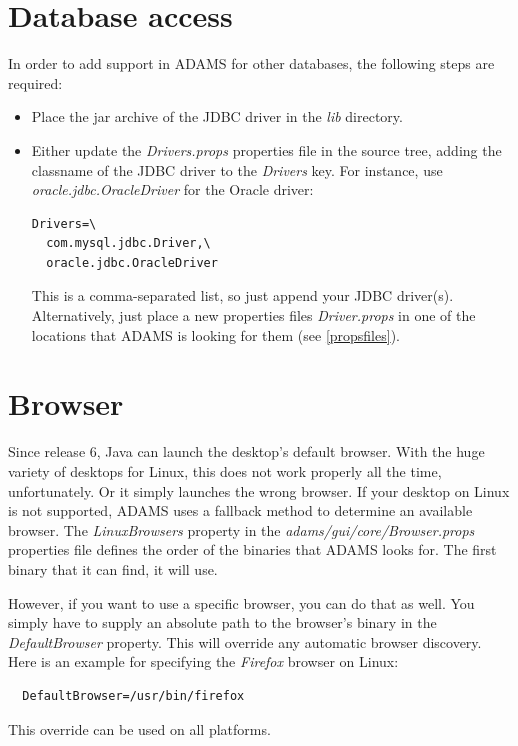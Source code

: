 \section{Database access}
\label{databaseaccess}
In order to add support in ADAMS for other databases, the following steps
are required:
\begin{itemize}
	\item Place the jar archive of the JDBC driver in the \textit{lib} directory.
	\item Either update the \textit{Drivers.props} properties file in the source
	tree, adding the classname of the JDBC driver to the \textit{Drivers} key. For instance,
	use \textit{oracle.jdbc.OracleDriver} for the Oracle driver: \\
\begin{verbatim}
Drivers=\
  com.mysql.jdbc.Driver,\
  oracle.jdbc.OracleDriver
\end{verbatim}
	This is a comma-separated list, so just append your JDBC driver(s). \\
	Alternatively, just place a new properties files \textit{Driver.props}
	in one of the locations that ADAMS is looking for them (see \ref{propsfiles}).
\end{itemize}

\section{Browser}
Since release 6, Java can launch the desktop's default browser. With the huge
variety of desktops for Linux, this does not work properly all the time, 
unfortunately. Or it simply launches the wrong browser. If your desktop on 
Linux is not supported, ADAMS uses a fallback method to determine an available browser. 
The \textit{LinuxBrowsers} property in the \textit{adams/gui/core/Browser.props} 
properties file defines the order of the binaries that ADAMS looks for. The first
binary that it can find, it will use.

However, if you want to use a specific browser, you can do that as well.
You simply have to supply an absolute path to the browser's binary in the
\textit{DefaultBrowser} property. This will override any automatic browser 
discovery. Here is an example for specifying the \textit{Firefox} browser on Linux:
\begin{verbatim}
  DefaultBrowser=/usr/bin/firefox
\end{verbatim}
This override can be used on all platforms.


